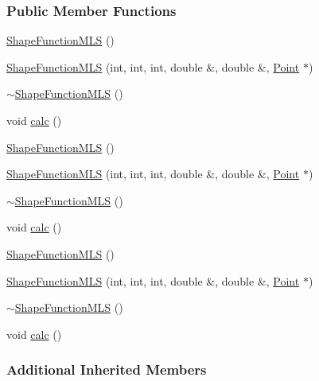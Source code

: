 \subsubsection*{Public Member Functions}
\begin{DoxyCompactItemize}
\item 
\hyperlink{classmknix_1_1_shape_function_m_l_s_a4f54b158c12126b557284995ee1ae561}{Shape\+Function\+M\+L\+S} ()
\item 
\hyperlink{classmknix_1_1_shape_function_m_l_s_aa650080de7f2243efce2e14c17e9e2c5}{Shape\+Function\+M\+L\+S} (int, int, int, double \&, double \&, \hyperlink{classmknix_1_1_point}{Point} $\ast$)
\item 
\hyperlink{classmknix_1_1_shape_function_m_l_s_a023ccf7cbc4ad50738271c4807c5f32a}{$\sim$\+Shape\+Function\+M\+L\+S} ()
\item 
void \hyperlink{classmknix_1_1_shape_function_m_l_s_a45b9a5887f30125379ec7ba0ed6fb8c9}{calc} ()
\item 
\hyperlink{classmknix_1_1_shape_function_m_l_s_a4f54b158c12126b557284995ee1ae561}{Shape\+Function\+M\+L\+S} ()
\item 
\hyperlink{classmknix_1_1_shape_function_m_l_s_aa650080de7f2243efce2e14c17e9e2c5}{Shape\+Function\+M\+L\+S} (int, int, int, double \&, double \&, \hyperlink{classmknix_1_1_point}{Point} $\ast$)
\item 
\hyperlink{classmknix_1_1_shape_function_m_l_s_a023ccf7cbc4ad50738271c4807c5f32a}{$\sim$\+Shape\+Function\+M\+L\+S} ()
\item 
void \hyperlink{classmknix_1_1_shape_function_m_l_s_a45b9a5887f30125379ec7ba0ed6fb8c9}{calc} ()
\item 
\hyperlink{classmknix_1_1_shape_function_m_l_s_a4f54b158c12126b557284995ee1ae561}{Shape\+Function\+M\+L\+S} ()
\item 
\hyperlink{classmknix_1_1_shape_function_m_l_s_aa650080de7f2243efce2e14c17e9e2c5}{Shape\+Function\+M\+L\+S} (int, int, int, double \&, double \&, \hyperlink{classmknix_1_1_point}{Point} $\ast$)
\item 
\hyperlink{classmknix_1_1_shape_function_m_l_s_a023ccf7cbc4ad50738271c4807c5f32a}{$\sim$\+Shape\+Function\+M\+L\+S} ()
\item 
void \hyperlink{classmknix_1_1_shape_function_m_l_s_a45b9a5887f30125379ec7ba0ed6fb8c9}{calc} ()
\end{DoxyCompactItemize}
\subsubsection*{Additional Inherited Members}


